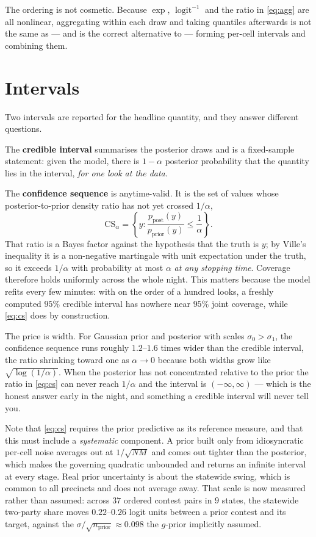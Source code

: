 \documentclass[11pt]{article}
\newcommand{\logit}{\operatorname{logit}}
\begin{document}
The ordering is not cosmetic. Because $\exp$, $\logit^{-1}$ and the ratio in \eqref{eq:agg}
are all nonlinear, aggregating within each draw and taking quantiles afterwards is not the
same as --- and is the correct alternative to --- forming per-cell intervals and combining
them.

\section{Intervals}\label{sec:int}

Two intervals are reported for the headline quantity, and they answer different questions.

The \textbf{credible interval} summarises the posterior draws and is a fixed-sample
statement: given the model, there is $1-\alpha$ posterior probability that the quantity
lies in the interval, \emph{for one look at the data}.

The \textbf{confidence sequence} is anytime-valid. It is the set of values whose
posterior-to-prior density ratio has not yet crossed $1/\alpha$,
\begin{equation}
  \mathrm{CS}_\alpha = \left\{ y : \frac{p_{\textrm{post}}(y)}{p_{\textrm{prior}}(y)} \le \frac{1}{\alpha} \right\}.
  \label{eq:cs}
\end{equation}
That ratio is a Bayes factor against the hypothesis that the truth is $y$; by Ville's
inequality it is a non-negative martingale with unit expectation under the truth, so it
exceeds $1/\alpha$ with probability at most $\alpha$ \emph{at any stopping time}. Coverage
therefore holds uniformly across the whole night. This matters because the model refits
every few minutes: with on the order of a hundred looks, a freshly computed $95\%$
credible interval has nowhere near $95\%$ joint coverage, while \eqref{eq:cs} does by
construction.

The price is width. For Gaussian prior and posterior with scales $\sigma_0 > \sigma_1$, the
confidence sequence runs roughly $1.2$--$1.6$ times wider than the credible interval, the
ratio shrinking toward one as $\alpha \to 0$ because both widths grow like
$\sqrt{\log(1/\alpha)}$. When the posterior has not concentrated relative to the prior the
ratio in \eqref{eq:cs} can never reach $1/\alpha$ and the interval is $(-\infty,\infty)$ ---
which is the honest answer early in the night, and something a credible interval will never
tell you.

Note that \eqref{eq:cs} requires the prior predictive as its reference measure, and that
this must include a \emph{systematic} component. A prior built only from idiosyncratic
per-cell noise averages out at $1/\sqrt{NM}$ and comes out tighter than the posterior,
which makes the governing quadratic unbounded and returns an infinite interval at every
stage. Real prior uncertainty is about the statewide swing, which is common to all
precincts and does not average away. That scale is now measured rather than assumed:
across $37$ ordered contest pairs in $9$ states, the statewide two-party share moves
$0.22$--$0.26$ logit units between a prior contest and its target, against the
$\sigma/\sqrt{n_{\textrm{prior}}} \approx 0.098$ the $g$-prior implicitly assumed.
\end{document}
